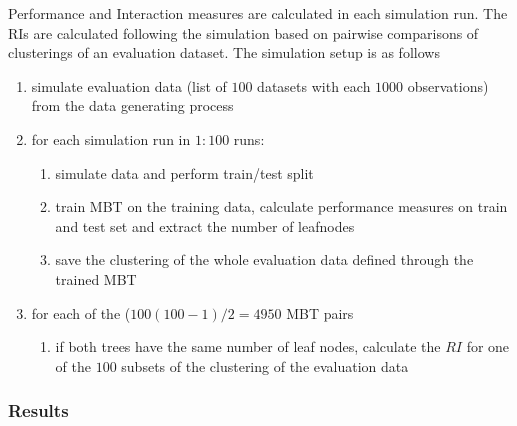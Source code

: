 Performance and Interaction measures are calculated in each simulation run.  
The RIs are calculated following the simulation based on pairwise comparisons of clusterings of an evaluation dataset. The simulation setup is as follows

\begin{enumerate}
    \item simulate evaluation data (list of $100$ datasets with each $1000$ observations) from the data generating process
    \item for each simulation run in $1:100$ runs:
    \begin{enumerate}
        \item simulate data and perform train/test split
        \item train MBT on the training data, calculate performance measures on train and test set and extract the number of leafnodes
        \item save the clustering of the whole evaluation data defined through the trained MBT
    \end{enumerate}
    \item for each of the ($100(100-1)/2 = 4950$ MBT pairs
    \begin{enumerate}
        \item if both trees have the same number of leaf nodes, calculate the $RI$ for one of the $100$ subsets of the clustering of the evaluation data
    \end{enumerate}
\end{enumerate}

\subsubsection{Results}
